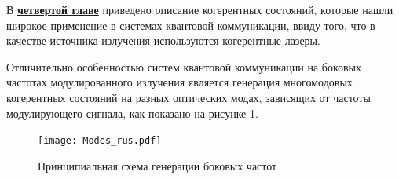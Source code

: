 
 В \underline{\textbf{четвертой главе}} приведено описание когерентных состояний, которые нашли широкое применение в системах квантовой коммуникации, ввиду того, что в качестве источника излучения используются когерентные лазеры. 
 
 Отличительно особенностью систем квантовой коммуникации на боковых частотах модулированного излучения является генерация многомодовых когерентных состояний на разных оптических модах, зависящих от частоты модулирующего сигнала, как показано на рисунке \ref{fig:multimodes}. 

 \begin{figure}[ht]
  \centering
  \texttt{[image: Modes\_rus.pdf]}
  \caption{Принципиальная схема генерации боковых частот}
  \label{fig:multimodes}
\end{figure}


